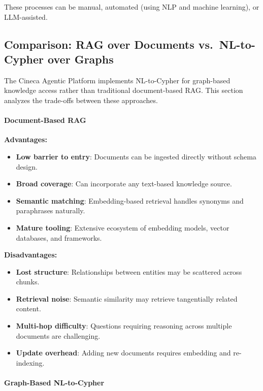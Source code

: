 \documentclass[a4paper,twoside]{sapthesis}
\begin{document}
These processes can be manual, automated (using NLP and machine learning), or LLM-assisted.

\subsection{Comparison: RAG over Documents vs.\ NL-to-Cypher over Graphs}

The Cineca Agentic Platform implements NL-to-Cypher for graph-based knowledge access rather than traditional document-based RAG. This section analyzes the trade-offs between these approaches.

\paragraph{Document-Based RAG}

\textbf{Advantages:}
\begin{itemize}
    \item \textbf{Low barrier to entry}: Documents can be ingested directly without schema design.
    \item \textbf{Broad coverage}: Can incorporate any text-based knowledge source.
    \item \textbf{Semantic matching}: Embedding-based retrieval handles synonyms and paraphrases naturally.
    \item \textbf{Mature tooling}: Extensive ecosystem of embedding models, vector databases, and frameworks.
\end{itemize}

\textbf{Disadvantages:}
\begin{itemize}
    \item \textbf{Lost structure}: Relationships between entities may be scattered across chunks.
    \item \textbf{Retrieval noise}: Semantic similarity may retrieve tangentially related content.
    \item \textbf{Multi-hop difficulty}: Questions requiring reasoning across multiple documents are challenging.
    \item \textbf{Update overhead}: Adding new documents requires embedding and re-indexing.
\end{itemize}

\paragraph{Graph-Based NL-to-Cypher}
\end{document}
